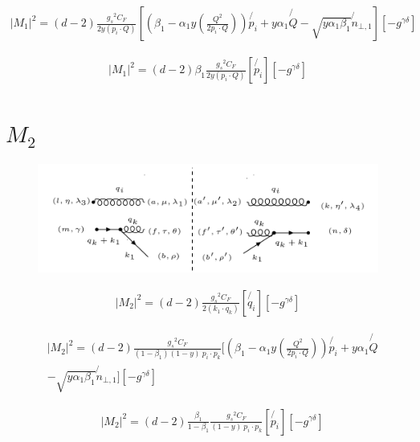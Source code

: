\begin{equation}
\begin{split}
|M_1|^2=(d-2)\frac{{g_s}^2 C_F}{2y(p_i \cdot Q)}[(\beta_1 -\alpha_1 y(\frac{Q^2}{2p_i \cdot Q}))\not{p_i} + y\alpha_1 \not{Q} - \sqrt{y\alpha_1\beta_1}{\not{n}_{\bot,1}}][-g^{{\gamma}{\delta}}]
\end{split}
\end{equation}

\begin{equation}
\begin{split}
|M_1|^2=(d-2)\beta_1\frac{{g_s}^2 C_F}{2y(p_i \cdot Q)}[\not{p_i}][-g^{{\gamma}{\delta}}]
\end{split}
\end{equation}

\pagebreak

\section{$ M_2 $}
\begin{figure}[ht!]
\centering
\includegraphics[scale=0.7]{images/GQ/M2Squer.png}
\end{figure}

\begin{equation}
\begin{split}
|M_2|^2=(d-2)\frac{{g_s}^2 C_F}{2(k_1 \cdot q_k)}[\not{q_i}][-g^{{\gamma}{\delta}}]
\end{split}
\end{equation}

\begin{equation}
\begin{split}
&|M_2|^2=(d-2)\frac{{g_s}^2 C_F}{(1-\beta_1) (1-y)\:p_i \cdot p_k}[(\beta_1 -\alpha_1 y(\frac{Q^2}{2p_i \cdot Q}))\not{p_i} + y\alpha_1 \not{Q} \\
&- \sqrt{y\alpha_1\beta_1}{\not{n}_{\bot,1}}][-g^{{\gamma}{\delta}}]
\end{split}
\end{equation}

\begin{equation}
\begin{split}
&|M_2|^2=(d-2)\frac{\beta_1}{1-\beta_1}\frac{{g_s}^2 C_F}{(1-y)\:p_i \cdot p_k}[\not{p_i}][-g^{{\gamma}{\delta}}]
\end{split}
\end{equation}

